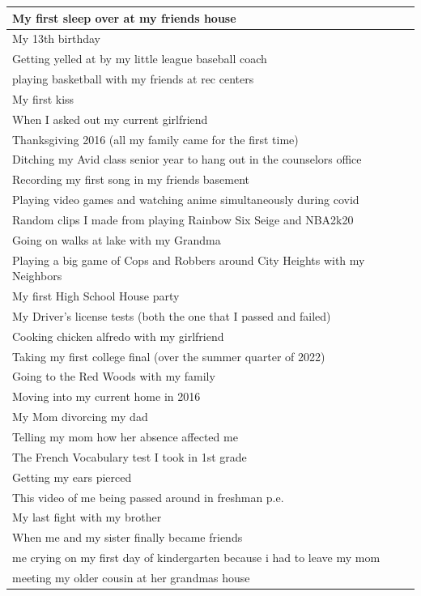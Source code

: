 \documentclass[
  .7em,
  letterpaper,
  DIV=11,
  numbers=noendperiod]{scrartcl}
\begin{document}
\begin{table}
\begin{tabular}{l}
My first sleep over at my friends house\\
\hline
My 13th birthday\\
\hline
Getting yelled at by my little league baseball coach\\
\hline
playing basketball with my friends at rec centers\\
\hline
My first kiss\\
\hline
When I asked out my current girlfriend\\
\hline
Thanksgiving 2016 (all my family came for the first time)\\
\hline
Ditching my Avid class senior year to hang out in the counselors office\\
\hline
Recording my first song in my friends basement\\
\hline
Playing video games and watching anime simultaneously during covid\\
\hline
Random clips I made from playing Rainbow Six Seige and NBA2k20\\
\hline
Going on walks at lake with my Grandma\\
\hline
Playing a big game of Cops and Robbers around City Heights with my Neighbors\\
\hline
My first High School House party\\
\hline
My Driver's license tests (both the one that I passed and failed)\\
\hline
Cooking chicken alfredo with my girlfriend\\
\hline
Taking my first college final (over the summer quarter of 2022)\\
\hline
Going to the Red Woods with my family\\
\hline
Moving into my current home in 2016\\
\hline
My Mom divorcing my dad\\
\hline
Telling my mom how her absence affected me\\
\hline
The French Vocabulary test I took in 1st grade\\
\hline
Getting my ears pierced\\
\hline
This video of me being passed around in freshman p.e.\\
\hline
My last fight with my brother\\
\hline
When me and my sister finally became friends\\
\hline
me crying on my first day of kindergarten because i had to leave my mom\\
\hline
meeting my older cousin at her grandmas house\\

\end{tabular}
\end{table}
\end{document}
